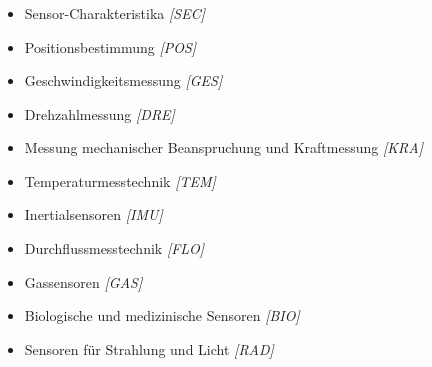 \begin{frame}
    \frametitle{\insertsection}
    \vfill
    \begin{itemize}

        \item Sensor-Charakteristika \emph{[SEC]}
        \item Positionsbestimmung \emph{[POS]}
        \item Geschwindigkeitsmessung \emph{[GES]}
        \item Drehzahlmessung \emph{[DRE]}
        \item Messung mechanischer Beanspruchung und Kraftmessung \emph{[KRA]}
        \item Temperaturmesstechnik \emph{[TEM]}
        \item Inertialsensoren \emph{[IMU]}
        \item Durchflussmesstechnik \emph{[FLO]}
        \item Gassensoren \emph{[GAS]}
        \item Biologische und medizinische Sensoren \emph{[BIO]}
        \item Sensoren für Strahlung und Licht \emph{[RAD]}
        
    \end{itemize}
\end{frame}

